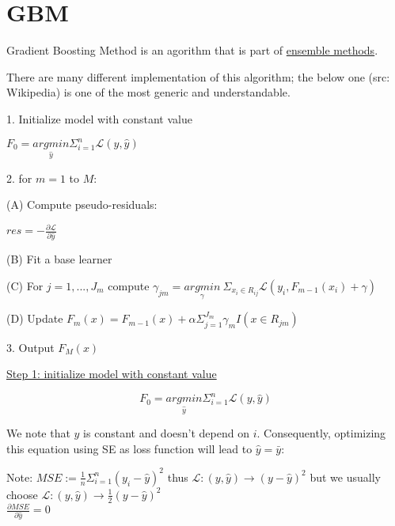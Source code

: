 \section*{GBM}

Gradient Boosting Method is an agorithm that is part of \hyperref[sec:ensemble-methods]{ensemble methods}.

There are many different implementation of this algorithm; the below one (src: Wikipedia) is one of the most generic and understandable.

\vspace{5mm}

1. Initialize model with constant value

$F_0 = \underset{\hat y}{argmin} \Sigma_{i=1}^n \mathcal{L}(y,\hat y)$

2. for $m = 1$ to $M$:

\hspace{1cm} (A) Compute pseudo-residuals:

\hspace{1cm}$res = - \frac{\partial \mathcal{L}}{\partial \hat y}$

\hspace{1cm} (B) Fit a base learner

\hspace{1cm} (C) For $j=1,...,J_m$ compute $\gamma_{jm} = \underset{\gamma}{argmin}~\Sigma_{x_i \in R_{ij}} \mathcal{L}(y_i, F_{m-1}(x_i)+\gamma)$

\hspace{1cm} (D) Update $F_m(x) = F_ {m-1}(x) + \alpha \Sigma_{j=1}^{J_m} \gamma_m I(x \in R_{jm})$

3. Output $F_M(x)$

\vspace{5mm}

\underline{Step 1: initialize model with constant value}

$$F_0 = \underset{\hat y}{argmin} \Sigma_{i=1}^n \mathcal{L}(y,\hat y)$$

We note that $\hat y$ is constant and doesn't depend on $i$. Consequently, optimizing this equation using SE as loss function will lead to $\hat y = \bar y$:

Note: $MSE := \frac{1}{n}\Sigma_{i=1}^n (y_i - \hat y)^2$ thus $\mathcal{L}: (y,\hat y) \to (y-\hat y)^2$ but we usually choose $\mathcal{L}: (y,\hat y) \to \frac{1}{2}(y-\hat y)^2$\\

$\frac{\partial MSE}{\partial \hat y} = 0$

